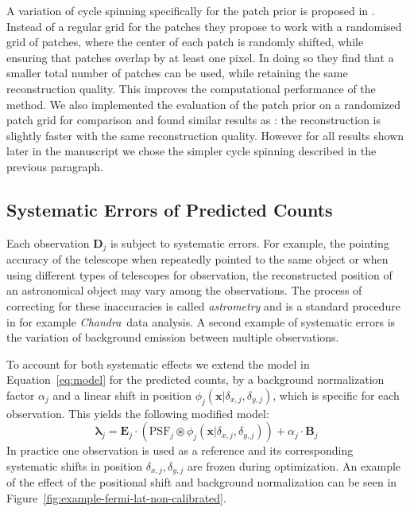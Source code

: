 \documentclass[twocolumn, lineno]{aastex631}
\newcommand{\chandra}{\textit{Chandra}~}
\begin{document}
    A variation of cycle spinning specifically for the patch prior is proposed in \cite{Parameswaran2018}. Instead of a regular grid for the patches they propose to work with a randomised grid of patches, where the center of each patch is randomly shifted, while ensuring that patches overlap by at least one pixel. In doing so they find that a smaller total number of patches can be used, while retaining the same reconstruction quality. This improves the computational performance of the method. We also implemented the evaluation of the patch prior on a randomized patch grid for comparison and found similar results as \cite{Parameswaran2018}: the reconstruction is slightly faster with the same reconstruction quality. However for all results shown later in the manuscript we chose the simpler cycle spinning described in the previous paragraph.

    \subsection{Systematic Errors of Predicted Counts}
    Each observation $\mathbf{D}_j$ is subject to systematic errors. For example, the pointing accuracy of the telescope when repeatedly pointed to the same object or when using different types of telescopes for observation, the reconstructed position of an astronomical object may vary among the observations. The process of correcting for these inaccuracies is called \textit{astrometry} and is a standard procedure in for example \chandra data analysis. A second example of systematic errors is the variation of background emission between multiple observations.
    
    To account for both systematic effects we extend the model in Equation~\ref{eq:model} for the predicted counts, by a background normalization factor $\alpha_j$ and a linear shift in position $\phi_j(\mathbf{x}| \delta_{x,j}, \delta_{y,j})$, which is specific for each observation. This yields the following modified model:
    \begin{equation}
        \label{eq:model-npred-calibration}
        \mathbf{\lambda}_j = \mathbf{E}_j \cdot  \left(\mathrm{PSF}_j \circledast \phi_j(\mathbf{x}| \delta_{x,j}, \delta_{y,j})\right) + \alpha_j \cdot \mathbf{B}_j
    \end{equation}
    In practice one observation is used as a reference and its corresponding systematic shifts in position $\delta_{x,j}, \delta_{y,j}$ are frozen during optimization. An example of the effect of the positional shift and background normalization can be seen in Figure~\ref{fig:example-fermi-lat-non-calibrated}.
\end{document}
